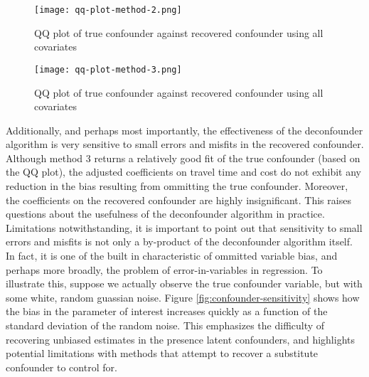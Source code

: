\begin{figure}
   \centering
   \texttt{[image: qq-plot-method-2.png]}
   \caption{QQ plot of true confounder against recovered confounder using all covariates}
   \label{fig:qq-plot-method-2}
\end{figure}

\begin{figure}
   \centering
   \texttt{[image: qq-plot-method-3.png]}
   \caption{QQ plot of true confounder against recovered confounder using all covariates}
   \label{fig:qq-plot-method-3}
\end{figure}



Additionally, and perhaps most importantly, the effectiveness of the
deconfounder algorithm is very sensitive to small errors and misfits in the
recovered confounder. Although method 3 returns a relatively good fit of the
true confounder (based on the QQ plot), the adjusted coefficients on travel
time and cost do not exhibit any reduction in the bias resulting from
ommitting the true confounder. Moreover, the coefficients on the recovered
confounder are highly insignificant. This raises questions about the
usefulness of the deconfounder algorithm in practice. Limitations notwithstanding, it is
important to point out that sensitivity to small errors and misfits is not only a by-product of the deconfounder
algorithm itself. In fact, it is one of the built in characteristic of ommitted
variable bias, and perhaps more broadly, the problem of error-in-variables in
regression. To illustrate this, suppose we actually observe the true
confounder variable, but with some white, random guassian noise. Figure \ref{fig:confounder-sensitivity}
shows how the bias in the parameter of interest increases quickly as a
function of the standard deviation of the random noise. This emphasizes the
difficulty of recovering unbiased estimates in the presence latent confounders,
and highlights potential limitations with methods that attempt to recover a
substitute confounder to control for.

